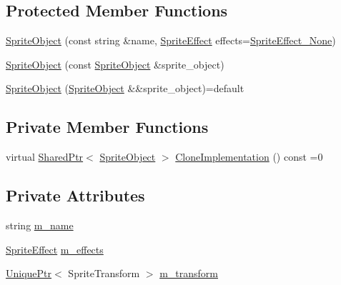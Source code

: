 \subsection*{Protected Member Functions}
\begin{DoxyCompactItemize}
\item 
\hyperlink{classmage_1_1_sprite_object_a1d487cfddfd6e3f60047f9316522ba8b}{Sprite\+Object} (const string \&name, \hyperlink{namespacemage_a9cfe18123066ba4236f548f9de75d881}{Sprite\+Effect} effects=\hyperlink{namespacemage_a9cfe18123066ba4236f548f9de75d881af3c275fbfacfe174da928b2f24dfa515}{Sprite\+Effect\+\_\+\+None})
\item 
\hyperlink{classmage_1_1_sprite_object_ac75871029cd740aeb0dd3e23d037b703}{Sprite\+Object} (const \hyperlink{classmage_1_1_sprite_object}{Sprite\+Object} \&sprite\+\_\+object)
\item 
\hyperlink{classmage_1_1_sprite_object_ab4207c10cd0324cec9a278cd1dac5c46}{Sprite\+Object} (\hyperlink{classmage_1_1_sprite_object}{Sprite\+Object} \&\&sprite\+\_\+object)=default
\end{DoxyCompactItemize}
\subsection*{Private Member Functions}
\begin{DoxyCompactItemize}
\item 
virtual \hyperlink{namespacemage_a1e01ae66713838a7a67d30e44c67703e}{Shared\+Ptr}$<$ \hyperlink{classmage_1_1_sprite_object}{Sprite\+Object} $>$ \hyperlink{classmage_1_1_sprite_object_a7ae445af224769ee5e69c9468670a03f}{Clone\+Implementation} () const =0
\end{DoxyCompactItemize}
\subsection*{Private Attributes}
\begin{DoxyCompactItemize}
\item 
string \hyperlink{classmage_1_1_sprite_object_a6f2a859e40ed391909bb4c87a8b74480}{m\+\_\+name}
\item 
\hyperlink{namespacemage_a9cfe18123066ba4236f548f9de75d881}{Sprite\+Effect} \hyperlink{classmage_1_1_sprite_object_a270f73b8d316f72c4228854d08a6d2ea}{m\+\_\+effects}
\item 
\hyperlink{namespacemage_a8c307fbcc33bce9b7f2aa4c26c3b95cf}{Unique\+Ptr}$<$ Sprite\+Transform $>$ \hyperlink{classmage_1_1_sprite_object_a9523ae6f081a8fde3cbb3558f6e327da}{m\+\_\+transform}
\end{DoxyCompactItemize}


